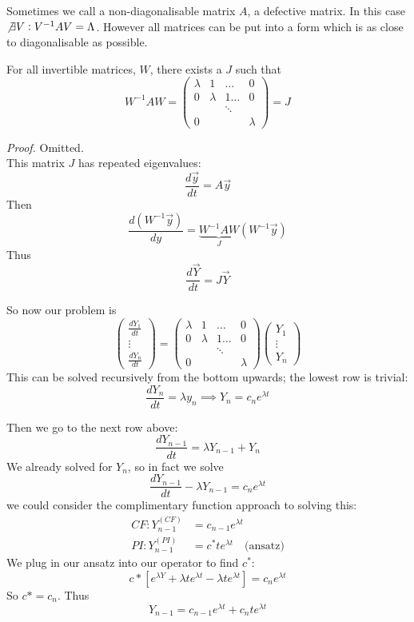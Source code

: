 \documentclass[10pt]{scrartcl}
\begin{document}


Sometimes we call a non-diagonalisable matrix $A$, a defective matrix. In this case $\not\exists V: V^{-1}AV = \Lambda$. However all matrices can be put into a form which is as close to diagonalisable as possible. 

\begin{theorem}
For all invertible matrices, $W$, there exists a $J$ such that 
\[
  W^{-1}AW = 
  \begin{pmatrix}
  \lambda & 1 & \dots & 0 \\
  0 & \lambda & 1 \dots  & 0 \\
   && \ddots  &\\
  0&&&\lambda 
\end{pmatrix} = J
\]	
\end{theorem}

\emph{Proof.} Omitted.\\

This matrix $J$ has repeated eigenvalues:
\[
  \frac{d\vec{y}}{dt} = A\vec{y}
\]
Then
\[
  \frac{d(W^{-1}\vec{y})}{dy} = \underbrace{W^{-1}AW}_{J}(W^{-1}\vec{y})
\]
Thus
\[
  \frac{d\vec{Y}}{dt} = J\vec{Y}
\]

So now our problem is
\[
  \begin{pmatrix}
  \frac{dY_1}{dt}\\ \vdots\\ \frac{dY_n}{dt}
\end{pmatrix}
= 
 \begin{pmatrix}
  \lambda & 1 & \dots & 0 \\
  0 & \lambda & 1 \dots  & 0 \\
   && \ddots  &\\
  0&&&\lambda 
\end{pmatrix}
\begin{pmatrix}
  Y_1 \\ \vdots \\ Y_n
\end{pmatrix}
\]
This can be solved recursively from the bottom upwards; the lowest row is trivial:
\[
  \frac{dY_n}{dt} = \lambda y_n
  \implies Y_n = c_ne^{\lambda t}
\]

Then we go to the next row above: 
\[
  \frac{dY_{n-1}}{dt} = \lambda Y_{n-1} + Y_n
\]
We already solved for $Y_n$, so in fact we solve
\[
  \frac{dY_{n-1}}{dt} - \lambda Y_{n-1} = c_ne^{\lambda t}
\]
we could consider the complimentary function approach to solving this:
\begin{align*}
  CF: Y_{n-1}^{(CF)} &= c_{n-1}e^{\lambda t}\\
  PI: Y_{n-1}^{(PI)} &= c^*te^{\lambda t} \quad \text{(ansatz)}
\end{align*}
We plug in our ansatz into our operator to find $c^*$: 
\[
  c*[e^{\lambda Y} + \lambda te^{\lambda t} - \lambda t e^{\lambda t}] = c_ne^{\lambda t}
\]
So $c* = c_n$. Thus 
\[
  Y_{n-1} = c_{n-1}e^{\lambda t} + c_nte^{\lambda t}
\]
\end{document}

